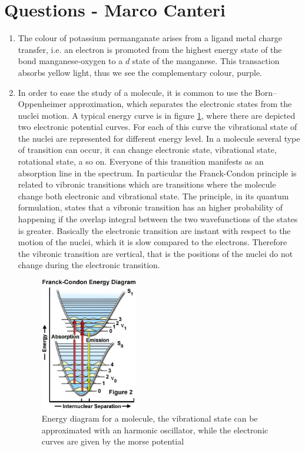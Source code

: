 \documentclass[a4paper,10pt]{article}
\begin{document}
\section{Questions - Marco Canteri}
\begin{enumerate}[label=\alph*)]
	\item The colour of potassium permanganate arises from a ligand metal charge transfer, i.e. an electron is promoted from the highest energy state of the bond manganese-oxygen to a $d$ state of the manganese. This transaction absorbs yellow light, thus we see the complementary colour, purple.
	\item In order to ease the study of a molecule, it is common to use the Born–Oppenheimer approximation, which separates the electronic states from the nuclei motion. A typical energy curve is in figure \ref{frank}, where there are depicted two electronic potential curves. For each of this curve the vibrational state of the nuclei are represented for different energy level. In a molecule several type of transition can occur, it can change electronic state, vibrational state, rotational state, a so on. Everyone of this transition manifests as an absorption line in the spectrum. In particular the Franck-Condon principle is related to vibronic transitions which are transitions where the molecule change both electronic and vibrational state. The principle, in its quantum formulation, states that a vibronic transition has an higher probability of happening if the overlap integral between the two wavefunctions of the states is greater. Basically the electronic transition are instant with respect to the motion of the nuclei, which it is slow compared to the electrons. Therefore the vibronic transition are vertical, that is the positions of the nuclei do not change during the electronic transition.
	\begin{figure}[H]
	\centering
	\includegraphics[width=0.4\textwidth]{frank.jpg}
	\caption{Energy diagram for a molecule, the vibrational state can be approximated with an harmonic oscillator, while the electronic curves are given by the morse potential}\label{frank}
	\end{figure}


\end{enumerate}
\end{document}
